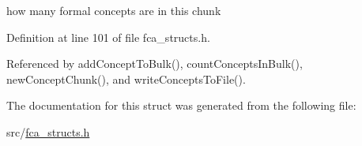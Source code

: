how many formal concepts are in this chunk 



\-Definition at line 101 of file fca\-\_\-structs.\-h.



\-Referenced by add\-Concept\-To\-Bulk(), count\-Concepts\-In\-Bulk(), new\-Concept\-Chunk(), and write\-Concepts\-To\-File().



\-The documentation for this struct was generated from the following file\-:\begin{DoxyCompactItemize}
\item 
src/\hyperlink{fca__structs_8h}{fca\-\_\-structs.\-h}\end{DoxyCompactItemize}
